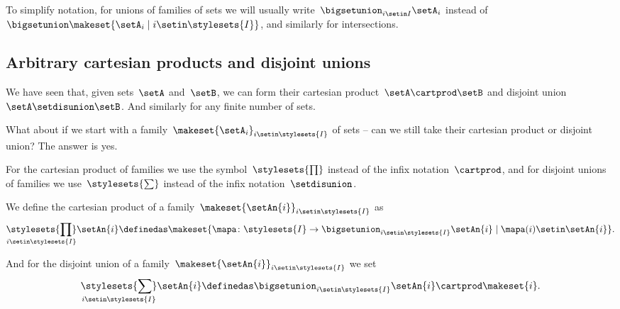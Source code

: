 \begin{remark}
    To simplify notation, for unions of families of sets we will usually write~$\bigsetunion_{i \setin I} \setA_i $ instead of~$\bigsetunion \makeset{  \setA_i \mid i \setin\stylesets{I} }$, and similarly for intersections.
\end{remark}

\subsection{Arbitrary cartesian products and disjoint unions}

We have seen that, given sets~$\setA$ and~$\setB$, we can form their cartesian product~$\setA \cartprod \setB$ and disjoint union~$\setA \setdisunion \setB$.
And similarly for any finite number of sets.

What about if we start with a family~$\makeset{ \setA_i }_{i \setin\stylesets{I}}$ of sets -- can we still take their cartesian product or disjoint union?
The answer is yes.

For the cartesian product of families we use the symbol~$\stylesets{\prod}$ instead of the infix notation~$\cartprod$, and for disjoint unions of families we use~$\stylesets{\sum}$ instead of the infix notation~$\setdisunion$.

We define the cartesian product of a family~$\makeset{ \setAn{i} }_{i \setin\stylesets{I}}$ as
\begin{equation}
    \underset{i \setin\stylesets{I}}{\stylesets{\prod}}  \setAn{i}  \definedas \makeset{ \mapa \colon \stylesets{I} \to \bigsetunion_{i \setin\stylesets{I} } \setAn{i} \mid \mapa(i) \setin\setAn{i} }.
\end{equation}

And for the disjoint union of a family~$\makeset{ \setAn{i} }_{i \setin\stylesets{I}}$ we set
\begin{equation}
    \underset{i \setin\stylesets{I}}{\stylesets{\sum}} \setAn{i} \definedas \bigsetunion_{i \setin\stylesets{I}} \setAn{i} \cartprod \makeset{ i }.
\end{equation}

